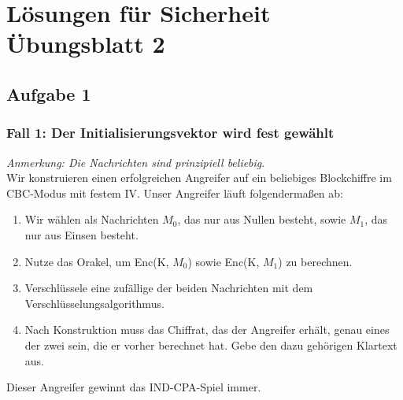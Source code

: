 \documentclass[12pt]{article}
\begin{document}
\section*{L\"osungen f\"ur Sicherheit \"Ubungsblatt 2}
\subsection*{Aufgabe 1}
\subsubsection*{Fall 1: Der Initialisierungsvektor wird fest gewählt}
\emph{Anmerkung: Die Nachrichten sind prinzipiell beliebig}.\\
Wir konstruieren einen erfolgreichen Angreifer auf ein beliebiges Blockchiffre im CBC-Modus mit festem IV.
Unser Angreifer läuft folgendermaßen ab:
\begin{enumerate}
  \item Wir w\"ahlen als Nachrichten $M_0$, das nur aus Nullen besteht, sowie $M_1$, das nur aus Einsen besteht.
  \item Nutze das Orakel, um Enc(K, $M_0$) sowie Enc(K, $M_1$) zu berechnen.
  \item Verschl\"ussele eine zuf\"allige der beiden Nachrichten mit dem Verschl\"usselungsalgorithmus.
  \item Nach Konstruktion muss das Chiffrat, das der Angreifer erhält, genau eines der zwei sein, die er vorher berechnet hat. Gebe den dazu geh\"origen Klartext aus.
\end{enumerate}
Dieser Angreifer gewinnt das IND-CPA-Spiel immer.
\end{document}
